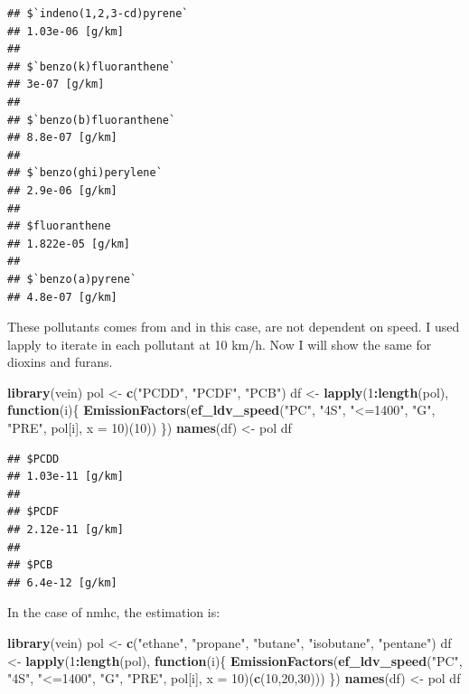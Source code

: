 \documentclass[12pt,graybox,envcountchap,sectrefs]{krantz}
\makeatletter
\newenvironment{Shaded}{\begin{snugshade}}{\end{snugshade}}
\newcommand{\KeywordTok}[1]{\textcolor[rgb]{0.13,0.29,0.53}{\textbf{#1}}}
\newcommand{\DataTypeTok}[1]{\textcolor[rgb]{0.13,0.29,0.53}{#1}}
\newcommand{\DecValTok}[1]{\textcolor[rgb]{0.00,0.00,0.81}{#1}}
\newcommand{\StringTok}[1]{\textcolor[rgb]{0.31,0.60,0.02}{#1}}
\newcommand{\ControlFlowTok}[1]{\textcolor[rgb]{0.13,0.29,0.53}{\textbf{#1}}}
\newcommand{\OperatorTok}[1]{\textcolor[rgb]{0.81,0.36,0.00}{\textbf{#1}}}
\newcommand{\NormalTok}[1]{#1}
\newenvironment{kframe}{%
\medskip{}
\setlength{\fboxsep}{.8em}
 \def\at@end@of@kframe{}%
 \ifinner\ifhmode%
  \def\at@end@of@kframe{\end{minipage}}%
  \begin{minipage}{\columnwidth}%
 \fi\fi%
 \def\FrameCommand##1{\hskip\@totalleftmargin \hskip-\fboxsep
 \colorbox{shadecolor}{##1}\hskip-\fboxsep
     \hskip-\linewidth \hskip-\@totalleftmargin \hskip\columnwidth}%
 \MakeFramed {\advance\hsize-\width
   \@totalleftmargin\z@ \linewidth\hsize
   \@setminipage}}%
 {\par\unskip\endMakeFramed%
 \at@end@of@kframe}
\renewenvironment{Shaded}{\begin{kframe}}{\end{kframe}}
\theoremstyle{definition}
\theoremstyle{definition}
\theoremstyle{definition}
\theoremstyle{remark}
\makeatother
\begin{document}
\begin{verbatim}
## $`indeno(1,2,3-cd)pyrene`
## 1.03e-06 [g/km]
## 
## $`benzo(k)fluoranthene`
## 3e-07 [g/km]
## 
## $`benzo(b)fluoranthene`
## 8.8e-07 [g/km]
## 
## $`benzo(ghi)perylene`
## 2.9e-06 [g/km]
## 
## $fluoranthene
## 1.822e-05 [g/km]
## 
## $`benzo(a)pyrene`
## 4.8e-07 [g/km]
\end{verbatim}

These pollutants comes from \citet{NtziachristosSamaras2016} and in this
case, are not dependent on speed. I used lapply to iterate in each
pollutant at 10 km/h. Now I will show the same for dioxins and furans.

\begin{Shaded}
\begin{Highlighting}[]
\KeywordTok{library}\NormalTok{(vein)}
\NormalTok{pol <-}\StringTok{ }\KeywordTok{c}\NormalTok{(}\StringTok{"PCDD"}\NormalTok{, }\StringTok{"PCDF"}\NormalTok{, }\StringTok{"PCB"}\NormalTok{)}
\NormalTok{df <-}\StringTok{ }\KeywordTok{lapply}\NormalTok{(}\DecValTok{1}\OperatorTok{:}\KeywordTok{length}\NormalTok{(pol), }\ControlFlowTok{function}\NormalTok{(i)\{}
  \KeywordTok{EmissionFactors}\NormalTok{(}\KeywordTok{ef_ldv_speed}\NormalTok{(}\StringTok{"PC"}\NormalTok{, }\StringTok{"4S"}\NormalTok{, }\StringTok{"<=1400"}\NormalTok{, }\StringTok{"G"}\NormalTok{, }\StringTok{"PRE"}\NormalTok{,}
\NormalTok{                               pol[i], }\DataTypeTok{x =} \DecValTok{10}\NormalTok{)(}\DecValTok{10}\NormalTok{))}
\NormalTok{\})}
\KeywordTok{names}\NormalTok{(df) <-}\StringTok{ }\NormalTok{pol}
\NormalTok{df}
\end{Highlighting}
\end{Shaded}

\begin{verbatim}
## $PCDD
## 1.03e-11 [g/km]
## 
## $PCDF
## 2.12e-11 [g/km]
## 
## $PCB
## 6.4e-12 [g/km]
\end{verbatim}

In the case of nmhc, the estimation is:

\begin{Shaded}
\begin{Highlighting}[]
\KeywordTok{library}\NormalTok{(vein)}
\NormalTok{pol <-}\StringTok{ }\KeywordTok{c}\NormalTok{(}\StringTok{"ethane"}\NormalTok{, }\StringTok{"propane"}\NormalTok{, }\StringTok{"butane"}\NormalTok{, }\StringTok{"isobutane"}\NormalTok{, }\StringTok{"pentane"}\NormalTok{)}
\NormalTok{df <-}\StringTok{ }\KeywordTok{lapply}\NormalTok{(}\DecValTok{1}\OperatorTok{:}\KeywordTok{length}\NormalTok{(pol), }\ControlFlowTok{function}\NormalTok{(i)\{}
  \KeywordTok{EmissionFactors}\NormalTok{(}\KeywordTok{ef_ldv_speed}\NormalTok{(}\StringTok{"PC"}\NormalTok{, }\StringTok{"4S"}\NormalTok{, }\StringTok{"<=1400"}\NormalTok{, }\StringTok{"G"}\NormalTok{, }\StringTok{"PRE"}\NormalTok{,}
\NormalTok{                               pol[i], }\DataTypeTok{x =} \DecValTok{10}\NormalTok{)(}\KeywordTok{c}\NormalTok{(}\DecValTok{10}\NormalTok{,}\DecValTok{20}\NormalTok{,}\DecValTok{30}\NormalTok{)))}
\NormalTok{\})}
\KeywordTok{names}\NormalTok{(df) <-}\StringTok{ }\NormalTok{pol}
\NormalTok{df}
\end{Highlighting}
\end{Shaded}
\end{document}
